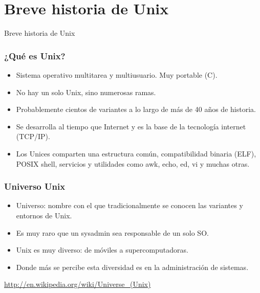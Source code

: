 \documentclass{beamer}
\begin{document}


\section{Breve historia de Unix}

\begin{frame}
  \begin{center}
    \Huge{Breve historia de Unix}
  \end{center}
\end{frame}



\begin{frame}
\frametitle{¿Qué es Unix?}


\begin{itemize}
\item Sistema operativo multitarea y multiusuario. Muy portable (C). 
\item No hay un solo Unix, sino numerosas ramas. 
\item Probablemente cientos de variantes a lo largo de más de 40 años de historia.
\item Se desarrolla al tiempo que Internet y es la base de la tecnología internet (TCP/IP).
\item Los Unices comparten una estructura común, compatibilidad binaria (ELF), POSIX shell, servicios y utilidades como awk, echo, ed, vi y muchas otras.
\end{itemize}

\end{frame}


\begin{frame}
\frametitle{Universo Unix}


\begin{itemize}
\item \alert{Universo}: nombre con el que tradicionalmente se conocen las variantes y entornos de Unix.
\item Es muy raro que un sysadmin sea responsable de un solo SO.
\item Unix es muy diverso: de móviles a supercomputadoras.
\item Donde más se percibe esta diversidad es en la administración de sistemas.
\end{itemize}

\url{http://en.wikipedia.org/wiki/Universe_(Unix)}

\end{frame}
\end{document}
